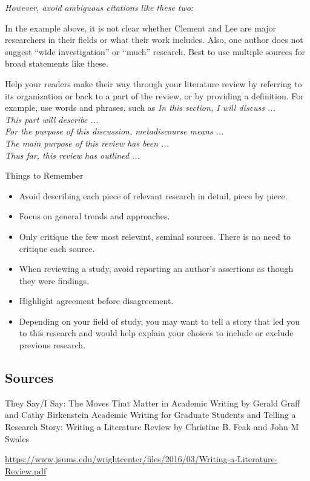 \textit{However, avoid ambiguous citations like these two:}

In the example above, it is not clear whether Clement and Lee are major
researchers in their fields or what their work includes. Also, one author does
not suggest “wide investigation” or “much” research. Best to use multiple
sources for broad statements like these.

Help your readers make their way through your literature review by referring to
its organization or back to a part of the review, or by providing a definition.
For example, use words and phrases, such as \textit{In this section, I will
	discuss ...\\ This part will describe ...\\ For the purpose of this discussion,
	metadiscourse means ...\\ The main purpose of this review has been ...\\ Thus
	far, this review has outlined ...\\}

Things to Remember
\begin{itemize}
	\item Avoid describing each piece of relevant research in detail, piece by piece.
	\item Focus on general trends and approaches.
	\item Only critique the few most relevant, seminal sources. There is no need to
	      critique each source.
	\item When reviewing a study, avoid reporting an author’s assertions as though they
	      were findings.
	\item Highlight agreement before disagreement.
	\item Depending on your field of study, you may want to tell a story that led you to
	      this research and would help explain your choices to include or exclude
	      previous research.
\end{itemize}

\subsection{Sources}
They Say/I Say: The Moves That Matter in Academic Writing by Gerald Graff and
Cathy Birkenstein Academic Writing for Graduate Students and Telling a Research
Story: Writing a Literature Review by Christine B. Feak and John M Swales

\url{https://www.jsums.edu/wrightcenter/files/2016/03/Writing-a-Literature-Review.pdf}

